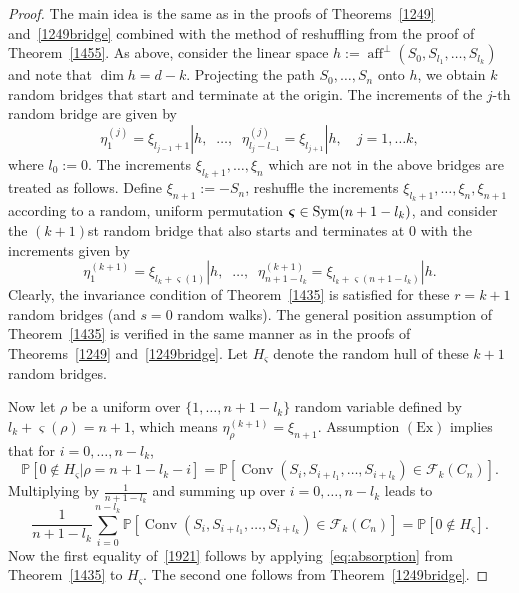 \documentclass[12pt, reqno]{amsart}
\theoremstyle{plain}
\theoremstyle{definition}
\theoremstyle{remark}
\begin{document}
\begin{proof}
The main idea is the same as in the  proofs of Theorems~\ref{1249} and~\ref{1249bridge} combined with the method of reshuffling from the proof of Theorem~\ref{1455}. As above, consider the linear space $h:={\mathop{\mathrm{aff}}\nolimits}^\perp(S_0,S_{l_1},\ldots,S_{l_{k}})$ and note that $\dim h = d-k$.  Projecting the path $S_0,\ldots,S_n$ onto $h$, we obtain  $k$ random bridges that  start and terminate at the origin. The increments of the $j$-th random bridge are given by
$$
\eta_1^{(j)}=\xi_{l_{j-1}+1}|h, \;\; \ldots, \;\; \eta_{l_{j}-l_{-1}}^{(j)}=\xi_{l_{j+1}}|h,
\quad j=1,\ldots k,
$$
where $l_0:=0$.
The increments $\xi_{l_{k}+1},\dots,\xi_n$ which are not in the above bridges are treated as follows. Define $\xi_{n+1} := -S_n$, reshuffle the increments $\xi_{l_{k}+1},\dots,\xi_n, \xi_{n+1}$ according to a random, uniform permutation ${{\boldsymbol{\varsigma}}}\in{\text{\rm Sym}}(n+1-l_k)$, and consider the $(k+1)$st random bridge that also starts and terminates at $0$ with the increments given by
$$
\eta_1^{(k+1)}=\xi_{l_k+{{\boldsymbol{\varsigma}}}(1)}|h, \;\; \ldots, \;\; \eta_{n+1-l_{k}}^{(k+1)}=\xi_{l_k+{{\boldsymbol{\varsigma}}}(n+1-l_{k})}|h.
$$
Clearly, the invariance condition of Theorem~\ref{1435} is satisfied for these $r=k+1$ random bridges (and $s=0$ random walks). The general position assumption of Theorem~\ref{1435} is verified in the same manner as in the  proofs of Theorems~\ref{1249} and~\ref{1249bridge}. Let $H_{{\boldsymbol{\varsigma}}}$ denote the random hull of these $k+1$ random bridges.

Now let $\rho$ be a uniform over $\{1,\dots,n+1-l_{k}\}$ random variable defined by $l_k+{{\boldsymbol{\varsigma}}}(\rho)=n+1$, which means $\eta_\rho^{(k+1)}=\xi_{n+1}$.  Assumption $(\text{Ex})$ implies that for $i=0,\dots,n-l_{k}$,
$$
{\mathbb{P}}[0\notin H_{{\boldsymbol{\varsigma}}}|\rho=n+1-l_k-i]={\mathbb{P}}[{\mathop{\mathrm{Conv}}\nolimits}(S_{i}, S_{i+l_1},\ldots, S_{i+l_{k}})\in {\mathcal{F}}_k(C_n)].
$$
Multiplying by $\frac{1}{n+1-l_k}$ and summing up over $i=0,\dots,n-l_k$  leads to
$$
\frac{1}{n+1-l_k} \sum_{i=0}^{n-l_k}  {\mathbb{P}}[{\mathop{\mathrm{Conv}}\nolimits}(S_{i}, S_{i+l_1},\ldots, S_{i+l_{k}})\in {\mathcal{F}}_k(C_n)]={\mathbb{P}}[0\notin H_{{\boldsymbol{\varsigma}}}].
$$
Now the first equality of~\eqref{1921} follows by applying~\eqref{eq:absorption} from Theorem~\ref{1435} to $H_{{\boldsymbol{\varsigma}}}$. The second one follows from Theorem~\ref{1249bridge}.
\end{proof}
\end{document}
